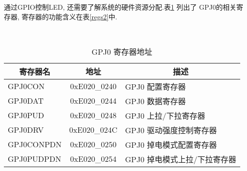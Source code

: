 	通过GPIO控制LED, 还需要了解系统的硬件资源分配.表{}\ref{regs1} 列出了
GPJ0的相关寄存器, 寄存器的功能含义在表{}\ref{regs2}中.
	
\begin{table}[!h]
\centering
\caption{GPJ0 寄存器地址}\label{regs1} \ \\

\begin{tabular}{|l|c|l|}
\hline
\multicolumn{1}{|c|}{寄存器名} & 地址 & 
\multicolumn{1}{c|}{描述} \\\hline
	GPJ0CON   & 0xE020\_0240 & GPJ0 配置寄存器              \\\hline
	GPJ0DAT   & 0xE020\_0244 & GPJ0 数据寄存器              \\\hline
	GPJ0PUD   & 0xE020\_0248 & GPJ0 上拉/下拉寄存器         \\\hline
	GPJ0DRV   & 0xE020\_024C & GPJ0 驱动强度控制寄存器      \\\hline
	GPJ0CONPDN& 0xE020\_0250 & GPJ0 掉电模式配置寄存器      \\\hline
	GPJ0PUDPDN& 0xE020\_0254 & GPJ0 掉电模式上拉/下拉寄存器 \\\hline
\end{tabular}
\end{table}


